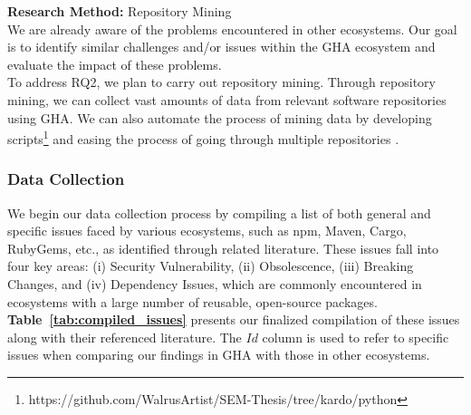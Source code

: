 \documentclass[conference]{IEEEtran}
\begin{document}
            \textbf{Research Method:} Repository Mining\\
            We are already aware of the problems encountered in other ecosystems. Our goal is to identify similar challenges and/or issues within the GHA ecosystem and evaluate the impact of these problems.\\
            To address RQ2, we plan to carry out repository mining. Through repository mining, we can collect vast amounts of data from relevant software repositories using GHA. We can also automate the process of mining data by developing scripts\footnote{https://github.com/WalrusArtist/SEM-Thesis/tree/kardo/python}  and easing the process of going through multiple repositories \cite{chaturvedi2013tools}.\\

            \subsubsection{\textbf{Data Collection}}
We begin our data collection process by compiling a list of both general and specific issues faced by various ecosystems, such as npm, Maven, Cargo, RubyGems, etc., as identified through related literature. These issues fall into four key areas: (i) Security Vulnerability, (ii) Obsolescence, (iii) Breaking Changes, and (iv) Dependency Issues, which are commonly encountered in ecosystems with a large number of reusable, open-source packages. \textbf{Table~\ref{tab:compiled_issues}} presents our finalized compilation of these issues along with their referenced literature. The $Id$ column is used to refer to specific issues when comparing our findings in GHA with those in other ecosystems.\\
\end{document}
